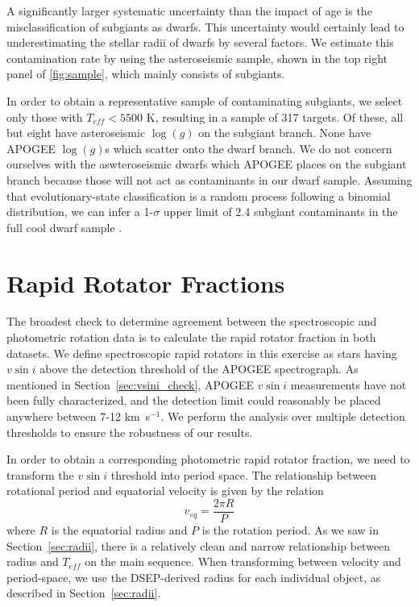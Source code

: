 \documentclass[manuscript]{aastex6}
\newcommand{\vsini}{\ensuremath{v \sin i}}
\newcommand{\Teff}{\ensuremath{T_{eff}}}
\newcommand{\logg}{\ensuremath{\log(g)}}
\newcommand{\kms}{\textrm{ km~s}\ensuremath{^{-1}}}
\begin{document}
A significantly larger systematic uncertainty than the impact of age is the 
misclassification of
subgiants as dwarfs. This uncertainty would certainly lead to underestimating
the stellar radii of dwarfs by several factors. We estimate this
contamination rate by using the asteroseismic sample, shown in the top right
panel of \cref{fig:sample}, which mainly consists of subgiants. 

In order to obtain a representative sample of contaminating subgiants, we
select only those with \(\Teff < 5500\) K, resulting in a sample of 317
targets. Of these, all but eight have asteroseismic \logg{} on the subgiant
branch. None have APOGEE \logg{}s which scatter onto the dwarf branch. We do
not concern ourselves with the aswteroseismic dwarfs which APOGEE places on the
subgiant branch because those will not act as contaminants in our dwarf sample. 
Assuming that evolutionary-state classification is a random
process following a binomial distribution, we can infer a 1-\(\sigma\) upper
limit of 2.4 subgiant contaminants in the full cool dwarf sample
\citep{Gehrels86}. 

\section{Rapid Rotator Fractions}
\label{sec:fraction}

The broadest check to determine agreement between the spectroscopic
and photometric rotation data is to calculate the rapid rotator fraction
in both datasets. We define spectroscopic rapid rotators in this exercise as 
stars having \vsini{} above the detection threshold of the APOGEE 
spectrograph. As mentioned in 
Section~\ref{sec:vsini_check}, APOGEE \vsini{} measurements have not been fully
characterized, and the detection limit could reasonably be placed anywhere 
between 7-12 \kms{}. We perform the analysis over multiple detection thresholds
to ensure the robustness of our results.

In order to obtain a corresponding photometric rapid rotator fraction, we need to 
transform the \vsini{} threshold into period space. The relationship between 
rotational period and equatorial velocity is given by the relation
\begin{displaymath}
    v_{eq} = \frac{2 \pi R}{P} 
\end{displaymath}
where \(R\) is the equatorial radius and \(P\) is the rotation period. As we
saw in Section~\ref{sec:radii}, there is a relatively clean and narrow
relationship between radius and \Teff{} on the main sequence. When transforming
between velocity and period-space, we use the DSEP-derived radius for each
individual object, as described in Section~\ref{sec:radii}.
\end{document}
